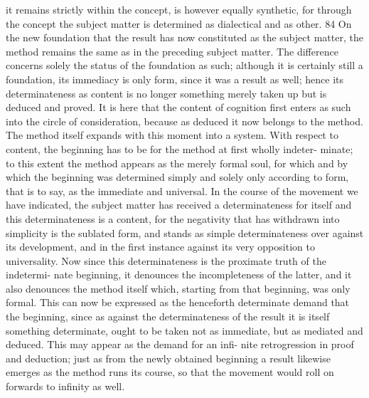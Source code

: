 it remains strictly within the concept, is however equally synthetic, for
through the concept the subject matter is determined as dialectical and as
other. 84 On the new foundation that the result has now constituted as the
subject matter, the method remains the same as in the preceding subject
matter. The difference concerns solely the status of the foundation as such;
although it is certainly still a foundation, its immediacy is only form, since
it was a result as well; hence its determinateness as content is no longer
something merely taken up but is deduced and proved.
It is here that the content of cognition first enters as such into the circle
of consideration, because as deduced it now belongs to the method. The
method itself expands with this moment into a system.
 With respect to
content, the beginning has to be for the method at first wholly indeter-
minate; to this extent the method appears as the merely formal soul, for
which and by which the beginning was determined simply and solely only
according to form, that is to say, as the immediate and universal. In the
course of the movement we have indicated, the subject matter has received
a determinateness for itself
 and this determinateness is a content, for the
negativity that has withdrawn into simplicity is the sublated form, and
stands as simple determinateness over against its development, and in the
first instance against its very opposition to universality.
Now since this determinateness is the proximate truth of the indetermi-
nate beginning, it denounces the incompleteness of the latter, and it also
denounces the method itself which, starting from that beginning, was only
formal. This can now be expressed as the henceforth determinate demand
that the beginning, since as against the determinateness of the result it
is itself something determinate, ought to be taken not as immediate, but
as mediated and deduced. This may appear as the demand for an infi-
nite retrogression in proof and deduction; just as from the newly obtained
beginning a result likewise emerges as the method runs its course, so that
the movement would roll on forwards to infinity as well.

